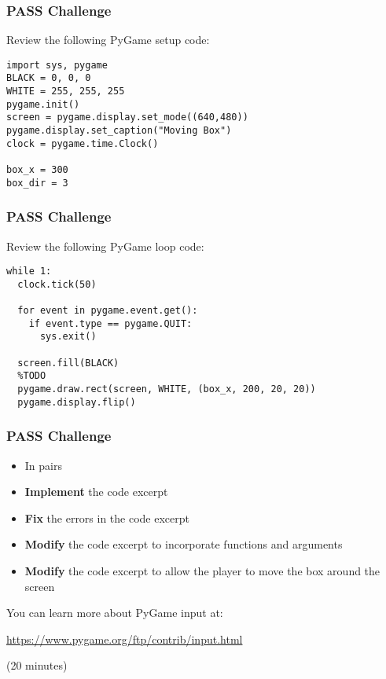 \begin{frame}[fragile]
	\frametitle{PASS Challenge}
		
	Review the following PyGame setup code:

	\begin{lstlisting}
import sys, pygame
BLACK = 0, 0, 0
WHITE = 255, 255, 255
pygame.init()
screen = pygame.display.set_mode((640,480))
pygame.display.set_caption("Moving Box")
clock = pygame.time.Clock()

box_x = 300
box_dir = 3
 	\end{lstlisting}
		
\end{frame}

\begin{frame}[fragile]
	\frametitle{PASS Challenge}
		
	Review the following PyGame loop code:

	\begin{lstlisting}
while 1:
  clock.tick(50)
 
  for event in pygame.event.get():
    if event.type == pygame.QUIT:
      sys.exit()
 
  screen.fill(BLACK)
  %TODO
  pygame.draw.rect(screen, WHITE, (box_x, 200, 20, 20))
  pygame.display.flip()
	\end{lstlisting}
		
\end{frame}

\begin{frame}
	\frametitle{PASS Challenge}
	
	\begin{itemize}
		\item In pairs
		\item \textbf{Implement} the code excerpt
		\item \textbf{Fix} the errors in the code excerpt
		\item \textbf{Modify} the code excerpt to incorporate functions and arguments
		\item \textbf{Modify} the code excerpt to allow the player to move the box around the screen
	\end{itemize}
	
	You can learn more about PyGame input at:
	
	\vspace{1em}
	
	 \url{https://www.pygame.org/ftp/contrib/input.html}
	
	\vspace{1em}
	
	(20 minutes)
	
\end{frame}